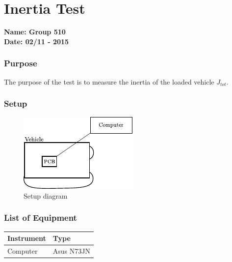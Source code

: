 \pagebreak
\section{Inertia Test}
\nopagebreak
\textbf{Name: Group 510}\\
\textbf{Date: 02/11 - 2015}

\subsubsection{Purpose}
The purpose of the test is to measure the inertia of the loaded vehicle $J_{tot}$.

\subsubsection{Setup}
\begin{figure}[H]
	\centering
	\includegraphics[scale=1.6]{figures/inertiaTestSetupDiagram2.pdf}
	\caption{Setup diagram}
	\label{inertiaTestSetupDiagram}
\end{figure}

\subsubsection{List of Equipment}

\begin{table}[H]
\begin{tabular}{|p{10cm}|p{4cm}|}
\hline%
  \textbf{Instrument}                     &  \textbf{Type}       \\
\hline%
  Computer                                &  Asus N73JN    \\
\hline %
\end{tabular}
\end{table}


